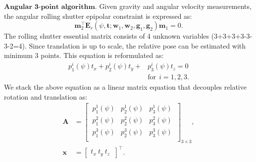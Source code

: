 \documentclass[10pt,twocolumn,letterpaper]{article}
\theoremstyle{definition}
\begin{document}
	\vspace{3mm}
	\noindent $\textbf{Angular 3-point algorithm.}$
	Given gravity and angular velocity measurements, the angular rolling shutter epipolar constraint is expressed as:
	\begin{equation}
	\mathbf{m}_{2}^{\top} \mathbf{E}_{r} (\psi,\mathbf{t}; \mathbf{w}_1,\mathbf{w}_2,\mathbf{g}_1,\mathbf{g}_2) \mathbf{m}_{1} = 0 .
	\label{eq:rolling_shutter_epipolar_geometry}
	\end{equation}
	The rolling shutter essential matrix consists of 4 unknown variables (3+3+3+3-3-3-2=4).
	Since translation is up to scale, the relative pose can be estimated with minimum 3 points.
	This equation is reformulated as: 
	\begin{equation}
	\begin{split}
	p_{1}^{i}(\psi) t_x + p_{2}^{i}(\psi) t_y + & p_{3}^{i}(\psi) t_z =  0\\
	& \text{for} \ \ i = 1,2,3.
	\end{split}
	\end{equation}
	We stack the above equation as a linear matrix equation that decouples relative rotation and translation as:
	\begin{equation}
	\begin{split}
	\mathbf{A} & = \begin{bmatrix}
	\ p_{1}^{1}(\psi) & p_{2}^{1}(\psi) & p_{3}^{1}(\psi) \ \\
	\ p_{1}^{2}(\psi) & p_{2}^{2}(\psi) & p_{3}^{2}(\psi) \ \\
	\ p_{1}^{3}(\psi) & p_{2}^{3}(\psi) & p_{3}^{3}(\psi) \ \\
	\end{bmatrix}_{3 \times 3} , 
	\\
	\mathbf{x} & = 
	\begin{bmatrix}
	t_x \ 
	t_y \
	t_z \
	\end{bmatrix}^{\top} .
	\end{split}
	\end{equation}
	
\end{document}
